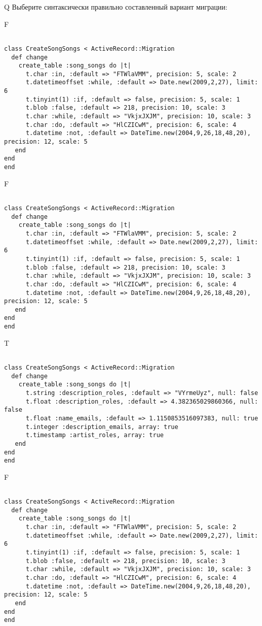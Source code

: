 Q
Выберите синтаксически правильно составленный вариант миграции:

F
\begin{verbatim}
		
class CreateSongSongs < ActiveRecord::Migration 
  def change 
    create_table :song_songs do |t| 
      t.char :in, :default => "FTWlaVMM", precision: 5, scale: 2
      t.datetimeoffset :while, :default => Date.new(2009,2,27), limit: 6
      t.tinyint(1) :if, :default => false, precision: 5, scale: 1
      t.blob :false, :default => 218, precision: 10, scale: 3
      t.char :while, :default => "VkjxJXJM", precision: 10, scale: 3
      t.char :do, :default => "HlCZICwM", precision: 6, scale: 4
      t.datetime :not, :default => DateTime.new(2004,9,26,18,48,20), precision: 12, scale: 5
   end
end
end
\end{verbatim}

F
\begin{verbatim}
		
class CreateSongSongs < ActiveRecord::Migration 
  def change 
    create_table :song_songs do |t| 
      t.char :in, :default => "FTWlaVMM", precision: 5, scale: 2
      t.datetimeoffset :while, :default => Date.new(2009,2,27), limit: 6
      t.tinyint(1) :if, :default => false, precision: 5, scale: 1
      t.blob :false, :default => 218, precision: 10, scale: 3
      t.char :while, :default => "VkjxJXJM", precision: 10, scale: 3
      t.char :do, :default => "HlCZICwM", precision: 6, scale: 4
      t.datetime :not, :default => DateTime.new(2004,9,26,18,48,20), precision: 12, scale: 5
   end
end
end
\end{verbatim}

T
\begin{verbatim}
		
class CreateSongSongs < ActiveRecord::Migration 
  def change 
    create_table :song_songs do |t| 
      t.string :description_roles, :default => "VYrmeUyz", null: false
      t.float :description_roles, :default => 4.382365029860366, null: false
      t.float :name_emails, :default => 1.1150853516097383, null: true
      t.integer :description_emails, array: true
      t.timestamp :artist_roles, array: true
   end
end
end
\end{verbatim}

F
\begin{verbatim}
		
class CreateSongSongs < ActiveRecord::Migration 
  def change 
    create_table :song_songs do |t| 
      t.char :in, :default => "FTWlaVMM", precision: 5, scale: 2
      t.datetimeoffset :while, :default => Date.new(2009,2,27), limit: 6
      t.tinyint(1) :if, :default => false, precision: 5, scale: 1
      t.blob :false, :default => 218, precision: 10, scale: 3
      t.char :while, :default => "VkjxJXJM", precision: 10, scale: 3
      t.char :do, :default => "HlCZICwM", precision: 6, scale: 4
      t.datetime :not, :default => DateTime.new(2004,9,26,18,48,20), precision: 12, scale: 5
   end
end
end
\end{verbatim}


